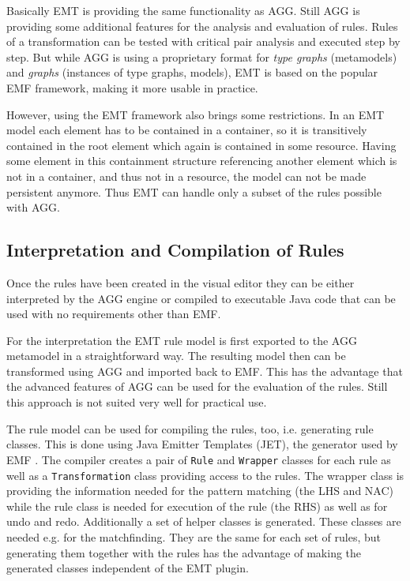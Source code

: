 Basically EMT is providing the same functionality as AGG. Still AGG is providing some additional features for the analysis and evaluation of rules. Rules of a transformation can be tested with critical pair analysis and executed step by step. But while AGG is using a proprietary format for \emph{type graphs} (metamodels) and \emph{graphs} (instances of type graphs, models), EMT is based on the popular EMF framework, making it more usable in practice. 

However, using the EMT framework also brings some restrictions. In an EMT model each element has to be contained in a container, so it is transitively contained in the root element which again is contained in some resource. Having some element in this containment structure referencing another element which is not in a container, and thus not in a resource, the model can not be made persistent anymore. Thus EMT can handle only a subset of the rules possible with AGG.


\subsection{Interpretation and Compilation of Rules}

Once the rules have been created in the visual editor they can be either interpreted by the AGG engine or compiled to executable Java code that can be used with no requirements other than EMF.

For the interpretation the EMT rule model is first exported to the AGG metamodel in a straightforward way. The resulting model then can be transformed using AGG and imported back to EMF. This has the advantage that the advanced features of AGG can be used for the evaluation of the rules. Still this approach is not suited very well for practical use.

The rule model can be used for compiling the rules, too, i.e. generating rule classes. This is done using Java Emitter Templates (JET), the generator used by EMF \cite{EMF}. The compiler creates a pair of \verb|Rule| and \verb|Wrapper| classes for each rule as well as a \verb|Transformation| class providing access to the rules. The wrapper class is providing the information needed for the pattern matching (the LHS and NAC) while the rule class is needed for execution of the rule (the RHS) as well as for undo and redo. Additionally a set of helper classes is generated. These classes are needed e.g. for the matchfinding. They are the same for each set of rules, but generating them together with the rules has the advantage of making the generated classes independent of the EMT plugin.

